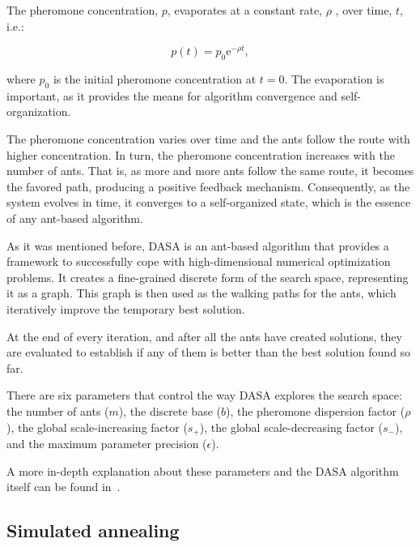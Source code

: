 The pheromone concentration, $p$, evaporates at a constant rate,
$\rho$ , over time, $t$, i.e.:

\begin{equation}
p(t)=p_{0}\mathrm{e}^{-\rho t},\label{eq:02-ACO_structure}
\end{equation}


\noindent where $p_{0}$ is the initial pheromone concentration at
$t=0$. The evaporation is important, as it provides the means for
algorithm convergence and self-organization.

The pheromone concentration varies over time and the ants follow the
route with higher concentration. In turn, the pheromone concentration
increases with the number of ants. That is, as more and more ants
follow the same route, it becomes the favored path, producing a positive
feedback mechanism. Consequently, as the system evolves in time, it
converges to a self-organized state, which is the essence of any ant-based
algorithm. 

\bigskip{}


As it was mentioned before, DASA is an ant-based algorithm that provides
a framework to successfully cope with high-dimensional numerical optimization
problems. It creates a fine-grained discrete form of the search space,
representing it as a graph. This graph is then used as the walking
paths for the ants, which iteratively improve the temporary best solution. 

At the end of every iteration, and after all the ants have created
solutions, they are evaluated to establish if any of them is better
than the best solution found so far.

There are six parameters that control the way DASA explores the search
space: the number of ants ($m$),
the discrete base ($b$),
the pheromone dispersion factor ($\rho$),
the global scale-increasing factor ($s_{+}$),
the global scale-decreasing factor ($s_{-}$),
and the maximum parameter precision ($\epsilon$).

A more in-depth explanation about these parameters and the DASA algorithm
itself can be found in~\cite{korosec2010_DASA}.


\subsection{Simulated annealing \label{sub:02-SA}}

